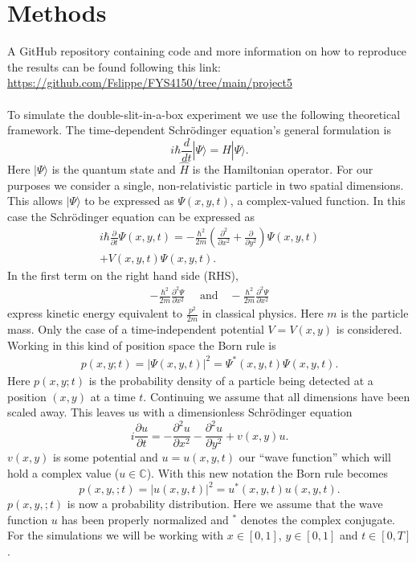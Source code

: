 \documentclass[english,notitlepage,reprint,nofootinbib]{revtex4-1}  %
\begin{document}
\section{Methods}\label{sec:methods}
%
A GitHub repository containing code and more information on how to reproduce the results can be found following this link:
\url{https://github.com/Fslippe/FYS4150/tree/main/project5} \\ \\
To simulate the double-slit-in-a-box experiment we use the following theoretical framework. The time-dependent Schrödinger equation's general formulation is
\begin{equation}
    i \hbar \frac{d}{dt} | \Psi \rangle = \hat{H} | \Psi \rangle.
\end{equation}
Here $| \Psi \rangle$ is the quantum state and $\hat{H}$ is the Hamiltonian operator. For our purposes we consider a single, non-relativistic particle in two spatial dimensions. This allows $| \Psi \rangle$ to be expressed as $ \Psi (x,y,t)$, a complex-valued function. In this case the Schrödinger equation can be expressed as
\begin{align}
    i \hbar \frac{\partial}{\partial t} \Psi(x,y,t) = - \frac{\hbar^2}{2m} \left( \frac{\partial^2}{\partial x^2} + \frac{\partial}{\partial y^2}\right) \Psi(x,y,t) \\
    + V(x,y,t) \Psi (x,y,t). \nonumber
\end{align}
In the first term on the right hand side (RHS),
\begin{align*}
    - \frac{\hbar^2}{2m} \frac{\partial^2 \Psi}{\partial x^2} \quad\text{ and}\quad - \frac{\hbar^2}{2m} \frac{\partial^2 \Psi}{\partial x^2}
\end{align*}
express kinetic energy equivalent to $\frac{p^2}{2m}$ in classical physics. Here $m$ is the particle mass. Only the case of a time-independent potential $V = V(x,y)$ is considered. Working in this kind of position space the Born rule is
\begin{align}
    p(x,y;t) = |\Psi(x,y,t)|^2 = \Psi^{\ast} (x,y,t) \Psi(x,y,t).
\end{align}
Here $p(x,y;t)$ is the probability density of a particle being detected at a position $(x,y)$ at a time $t$. Continuing we assume that all dimensions have been scaled away. This leaves us with a dimensionless Schrödinger equation
\begin{equation}
    i \frac{\partial u}{\partial t} = - \frac{\partial^2 u}{\partial x^2} - \frac{\partial^2 u}{\partial y^2} + v(x,y)u. \label{eq:wave_eq}
\end{equation}
$v(x,y)$ is some potential and $u = u(x,y,t)$ our ``wave function'' which will hold a complex value ($u \in \mathbb{C}$). With this new notation the Born rule becomes
\begin{equation}
    p(x,y,;t) = |u(x,y,t)|^2 = u^{\ast} (x,y,t) u(x,y,t). \label{eq:born}
\end{equation}
$p(x,y,;t)$ is now a probability distribution.
Here we assume that the wave function $u$ has been properly normalized and $^*$ denotes the complex conjugate. For the simulations we will be working with $x \in [0,1]$, $y \in [0,1]$ and $t \in [0,T]$.
\end{document}
